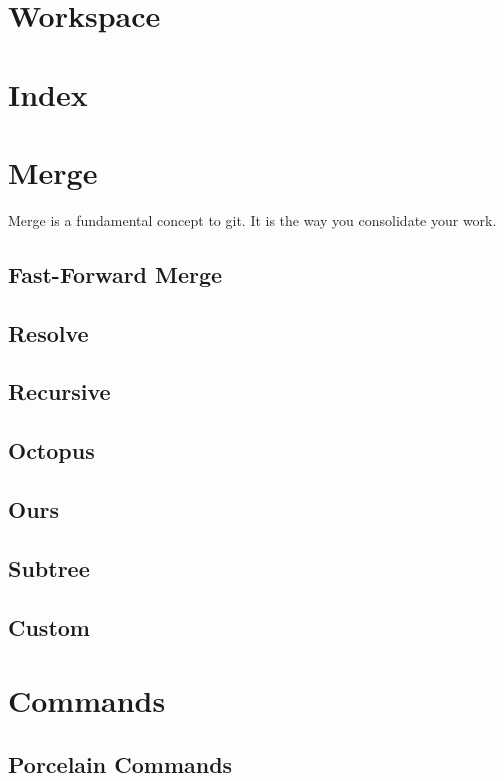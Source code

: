\section{Workspace}

\section{Index}

\section{Merge}

Merge is a fundamental concept to git. It is the way you consolidate your work.

\subsection{Fast-Forward Merge}

\subsection{Resolve}

\subsection{Recursive}

\subsection{Octopus}

\subsection{Ours}

\subsection{Subtree}

\subsection{Custom}

\section{Commands}


\subsection{Porcelain Commands}

